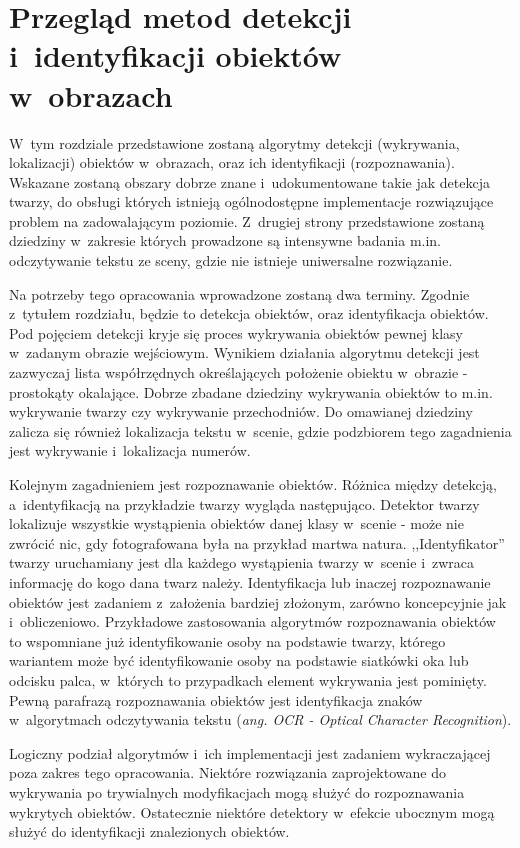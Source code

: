 \chapter{Przegląd metod detekcji i~identyfikacji obiektów w~obrazach}

W~tym rozdziale przedstawione zostaną algorytmy detekcji (wykrywania,
lokalizacji) obiektów w~obrazach, oraz ich identyfikacji (rozpoznawania).
Wskazane zostaną obszary dobrze znane i~udokumentowane takie jak detekcja
twarzy, do obsługi których istnieją ogólnodostępne implementacje
rozwiązujące problem na zadowalającym poziomie. Z~drugiej strony
przedstawione zostaną dziedziny w~zakresie których prowadzone są intensywne
badania m.in. odczytywanie tekstu ze sceny, gdzie nie istnieje uniwersalne
rozwiązanie.

Na potrzeby tego opracowania wprowadzone zostaną dwa terminy. Zgodnie
z~tytułem rozdziału, będzie to detekcja obiektów, oraz identyfikacja
obiektów. Pod pojęciem detekcji kryje się proces wykrywania obiektów
pewnej klasy w~zadanym obrazie wejściowym. 
Wynikiem działania algorytmu detekcji jest zazwyczaj lista
współrzędnych określających położenie obiektu w~obrazie - prostokąty
okalające. Dobrze zbadane dziedziny wykrywania obiektów to m.in. 
wykrywanie twarzy czy wykrywanie przechodniów. Do omawianej dziedziny
zalicza się również lokalizacja tekstu w~scenie, gdzie podzbiorem
tego zagadnienia jest wykrywanie i~lokalizacja numerów.

Kolejnym zagadnieniem jest rozpoznawanie obiektów. Różnica między
detekcją, a~identyfikacją na przykładzie twarzy wygląda następująco.
Detektor twarzy lokalizuje wszystkie wystąpienia obiektów danej klasy
w~scenie - może nie zwrócić nic, gdy fotografowana była na przykład martwa
natura. ,,Identyfikator'' twarzy uruchamiany jest dla każdego wystąpienia
twarzy w~scenie i~zwraca informację do kogo dana twarz należy.
Identyfikacja lub inaczej rozpoznawanie obiektów jest zadaniem z~założenia
bardziej złożonym, zarówno koncepcyjnie jak i~obliczeniowo.
Przykładowe zastosowania algorytmów rozpoznawania obiektów to wspomniane
już identyfikowanie osoby na podstawie twarzy, którego wariantem może
być identyfikowanie osoby na podstawie siatkówki oka lub odcisku palca,
w~których to przypadkach element wykrywania jest pominięty. 
Pewną parafrazą
rozpoznawania obiektów jest identyfikacja znaków w~algorytmach odczytywania
tekstu (\textit{ang. OCR - Optical Character Recognition}).

Logiczny podział algorytmów i~ich implementacji jest zadaniem 
wykraczającej poza zakres tego opracowania. Niektóre rozwiązania
zaprojektowane do wykrywania po trywialnych modyfikacjach mogą służyć
do rozpoznawania wykrytych obiektów. Ostatecznie niektóre detektory
w~efekcie ubocznym mogą służyć do identyfikacji znalezionych obiektów.

